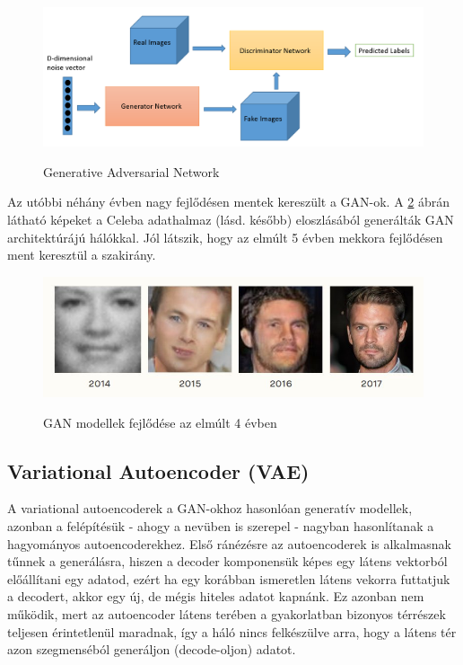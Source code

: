 \documentclass[12pt]{article}
\begin{document}
\begin{figure}[h!]
\begin{center}
  \label{gan}
  \includegraphics[width=\linewidth]{gan.png}
  \caption{Generative Adversarial Network}
\end{center}
\end{figure}

Az utóbbi néhány évben nagy fejlődésen mentek kereszült a GAN-ok. A \ref{gan_progress} ábrán látható képeket a Celeba adathalmaz (lásd. később) eloszlásából generálták GAN architektúrájú hálókkal. Jól látszik, hogy az elmúlt 5 évben mekkora fejlődésen ment keresztül a szakirány. 

\begin{figure}[h!]
\begin{center}
  \label{gan_progress}
  \includegraphics[width=\linewidth]{gan_progress.jpg}
  \caption{GAN modellek fejlődése az elmúlt 4 évben}
\end{center}
\end{figure}

\subsection{Variational Autoencoder (VAE)}

A variational autoencoderek a GAN-okhoz hasonlóan generatív modellek, azonban a felépítésük - ahogy a nevüben is szerepel -  nagyban hasonlítanak a hagyományos autoencoderekhez.
Első ránézésre az autoencoderek is alkalmasnak tűnnek a generálásra, hiszen a decoder komponensük képes egy látens vektorból előállítani egy adatod, ezért ha egy korábban ismeretlen látens vekorra futtatjuk a decodert, akkor egy új, de mégis hiteles adatot kapnánk. Ez azonban nem működik, mert az autoencoder látens terében a gyakorlatban bizonyos térrészek teljesen érintetlenül maradnak, így a háló nincs felkészülve arra, hogy a látens tér azon szegmenséból generáljon (decode-oljon) adatot.
\end{document}
